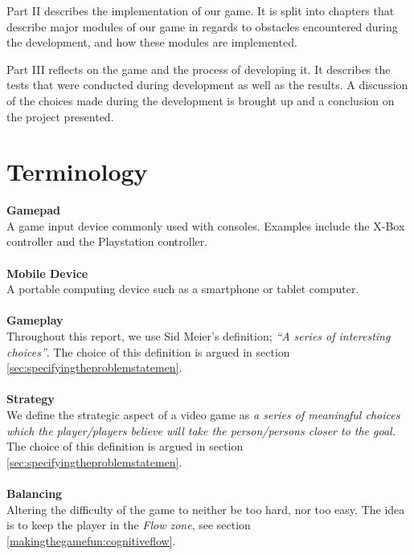 Part II describes the implementation of our game.
It is split into chapters that describe major modules of our game in regards to obstacles encountered during the development, and how these modules are implemented.

Part III reflects on the game and the process of developing it. It describes the tests that were conducted during development as well as the results. A discussion of the choices made during the development is brought up and a conclusion on the project presented.

\section*{Terminology}\label{preface:terminology}
\textbf{Gamepad}\vspace{4pt}\\
A game input device commonly used with consoles.
Examples include the X-Box controller and the Playstation controller.\\
\\
\textbf{Mobile Device}\vspace{4pt}\\
A portable computing device such as a smartphone or tablet computer.\cite{mobileOx}\\
\\
\textbf{Gameplay}\vspace{4pt}\\
Throughout this report, we use Sid Meier's definition; \textit{``A series of interesting choices''}\cite{GDC2012}.
The choice of this definition is argued in section \ref{sec:specifyingtheproblemstatemen}.\\
\\
\textbf{Strategy}\vspace{4pt}\\
We define the strategic aspect of a video game as \emph{a series of meaningful choices which the player/players believe will take the person/persons closer to the goal.}
The choice of this definition is argued in section \ref{sec:specifyingtheproblemstatemen}.\\
\\
\textbf{Balancing}\vspace{4pt}\\
Altering the difficulty of the game to neither be too hard, nor too easy.
The idea is to keep the player in the \textit{Flow zone}, see section \ref{makingthegamefun:cognitiveflow}.\\
\\
